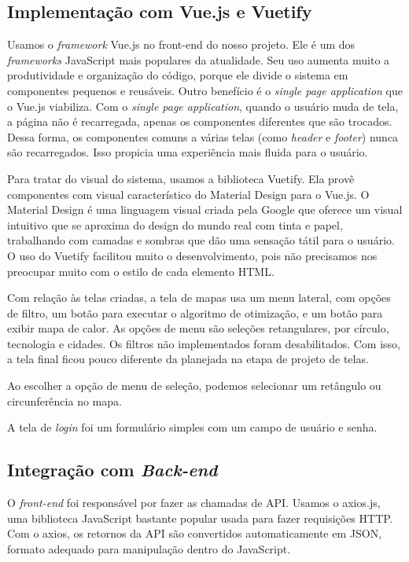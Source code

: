 \documentclass[]{politex}
\begin{document}
\subsection{Implementação com Vue.js e Vuetify}
Usamos o \textit{framework} Vue.js no front-end do nosso projeto. Ele é um dos
\textit{frameworks} JavaScript mais populares da atualidade. Seu uso aumenta
muito a produtividade e organização do código, porque ele divide o sistema em
componentes pequenos e reusáveis. Outro benefício é o \textit{single page application} que o Vue.js viabiliza.
Com o \textit{single page application}, quando o usuário muda de tela, a página não é recarregada, apenas os
componentes diferentes que são trocados. Dessa forma, os componentes comuns a várias telas (como \textit{header} e \textit{footer})
nunca são recarregados. Isso propicia uma experiência mais fluida para o usuário.

Para tratar do visual do sistema, usamos a biblioteca Vuetify. Ela provê componentes 
com visual característico do Material Design para o Vue.js. O Material Design é
uma linguagem visual criada pela Google que oferece um visual intuitivo que
se aproxima do design do mundo real com tinta e papel, trabalhando com camadas
e sombras que dão uma sensação tátil para o usuário. O uso do Vuetify facilitou
muito o desenvolvimento, pois não precisamos nos preocupar muito com o estilo de
cada elemento HTML.

Com relação às telas criadas, a tela de mapas usa um menu lateral, com opções de
filtro, um botão para executar o algoritmo de otimização, e um botão para exibir mapa de
calor. As opções de menu são seleções retangulares, por círculo, tecnologia e
cidades. Os filtros não implementados foram desabilitados.
Com isso, a tela final ficou pouco diferente da planejada na etapa de projeto de 
telas. 


Ao escolher a opção de menu de seleção, podemos selecionar um retângulo ou
circunferência no mapa.

A tela de \textit{login} foi um formulário simples com um campo de usuário e senha.


\subsection{Integração com \textit{Back-end}}

O \textit{front-end} foi responsável por fazer as chamadas de API.
Usamos o axios.js, uma biblioteca JavaScript bastante popular usada para fazer
requisições HTTP. Com o axios, os retornos da API são convertidos
automaticamente em JSON, formato adequado para manipulação dentro do JavaScript.
\end{document}
